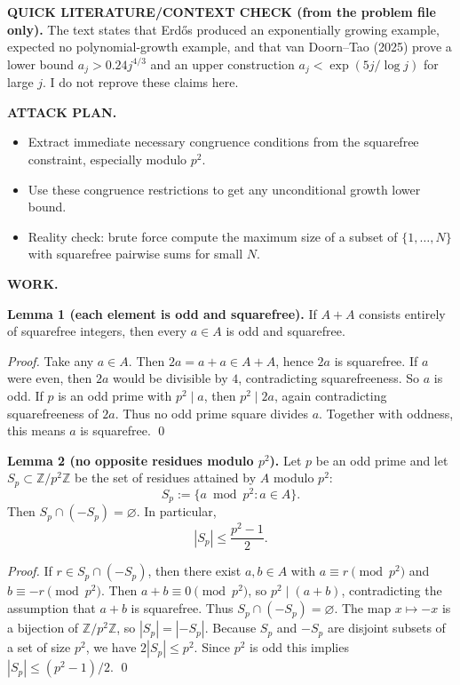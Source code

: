 \medskip
\noindent\textbf{QUICK LITERATURE/CONTEXT CHECK (from the problem file only).}
The text states that Erd\H{o}s produced an exponentially growing example, expected no polynomial-growth example, and that van Doorn--Tao (2025) prove a lower bound $a_j>0.24j^{4/3}$ and an upper construction $a_j<\exp(5j/\log j)$ for large $j$.
I do not reprove these claims here.

\medskip
\noindent\textbf{ATTACK PLAN.}
\begin{itemize}
\item Extract immediate necessary congruence conditions from the squarefree constraint, especially modulo $p^2$.
\item Use these congruence restrictions to get any unconditional growth lower bound.
\item Reality check: brute force compute the maximum size of a subset of $\{1,\dots,N\}$ with squarefree pairwise sums for small $N$.
\end{itemize}

\medskip
\noindent\textbf{WORK.}

\medskip
\noindent\textbf{Lemma 1 (each element is odd and squarefree).}
If $A+A$ consists entirely of squarefree integers, then every $a\in A$ is odd and squarefree.

\noindent\emph{Proof.}
Take any $a\in A$. Then $2a=a+a\in A+A$, hence $2a$ is squarefree.
If $a$ were even, then $2a$ would be divisible by $4$, contradicting squarefreeness.
So $a$ is odd.
If $p$ is an odd prime with $p^2\mid a$, then $p^2\mid 2a$, again contradicting squarefreeness of $2a$.
Thus no odd prime square divides $a$.
Together with oddness, this means $a$ is squarefree. \qed

\medskip
\noindent\textbf{Lemma 2 (no opposite residues modulo $p^2$).}
Let $p$ be an odd prime and let $S_p\subset\mathbb Z/p^2\mathbb Z$ be the set of residues attained by $A$ modulo $p^2$:
\[S_p:=\{a\bmod p^2: a\in A\}.
\]
Then $S_p\cap(-S_p)=\varnothing$. In particular,
\[|S_p|\le \frac{p^2-1}{2}.
\]

\noindent\emph{Proof.}
If $r\in S_p\cap(-S_p)$, then there exist $a,b\in A$ with
$a\equiv r\pmod{p^2}$ and $b\equiv -r\pmod{p^2}$.
Then $a+b\equiv 0\pmod{p^2}$, so $p^2\mid(a+b)$, contradicting the assumption that $a+b$ is squarefree.
Thus $S_p\cap(-S_p)=\varnothing$.
The map $x\mapsto -x$ is a bijection of $\mathbb Z/p^2\mathbb Z$, so $|S_p|=|-S_p|$.
Because $S_p$ and $-S_p$ are disjoint subsets of a set of size $p^2$, we have $2|S_p|\le p^2$.
Since $p^2$ is odd this implies $|S_p|\le (p^2-1)/2$. \qed

